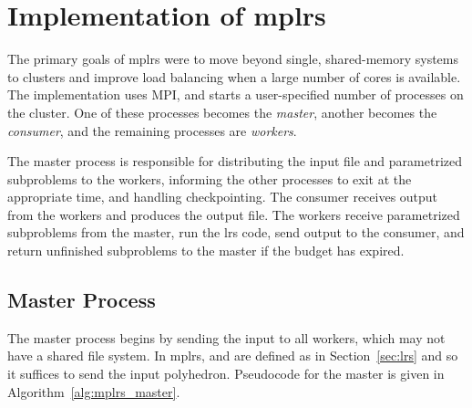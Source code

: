 \documentclass[a4paper,11pt]{article}   \usepackage{authblk} \usepackage[top=1.9cm,bottom=1.9cm,left=1.9cm,right=1.9cm]{geometry}
\newcommand{\progname}{\textsf}
\newcommand{\lrs}{\progname{lrs}\xspace}
\newcommand{\mplrs}{\progname{mplrs}\xspace}
\begin{document}
\section{Implementation of \mplrs}
\label{sec:mplrs}

The primary goals of \mplrs were to move beyond single, shared-memory
systems to clusters and improve load balancing when a large number of cores is available.
The implementation uses MPI, and starts a user-specified number of
processes on the cluster.  One of these processes becomes the \emph{master},
another becomes the \emph{consumer}, and the remaining processes are
\emph{workers}.

The master process is responsible for distributing the input file and
parametrized subproblems to the workers, informing the other processes to exit
at the appropriate time, and handling checkpointing.  The consumer
receives output from the workers and produces the output file.  The workers
receive parametrized subproblems from the master, run the \lrs
code,  send output to the consumer, and return unfinished subproblems 
to the master if the budget has expired.

\subsection{Master Process}
\label{subsec:mplrs_master}

The master process begins by sending the input to all workers,
which may not have a shared file system.
In \mplrs,  and  are defined as in
Section~\ref{sec:lrs} and so it suffices to send the input polyhedron.
Pseudocode for the master is given
in Algorithm~\ref{alg:mplrs_master}.
\end{document}
